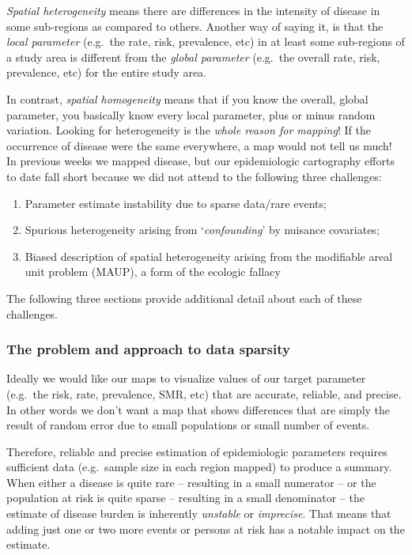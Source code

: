 \documentclass[
]{book}
\providecommand{\tightlist}{%
  \setlength{\itemsep}{0pt}\setlength{\parskip}{0pt}}
\begin{document}
\emph{Spatial heterogeneity} means there are differences in the intensity of disease in some sub-regions as compared to others. Another way of saying it, is that the \emph{local parameter} (e.g.~the rate, risk, prevalence, etc) in at least some sub-regions of a study area is different from the \emph{global parameter} (e.g.~the overall rate, risk, prevalence, etc) for the entire study area.

In contrast, \emph{spatial homogeneity} means that if you know the overall, global parameter, you basically know every local parameter, plus or minus random variation. Looking for heterogeneity is the \emph{whole reason for mapping}! If the occurrence of disease were the same everywhere, a map would not tell us much! In previous weeks we mapped disease, but our epidemiologic cartography efforts to date fall short because we did not attend to the following three challenges:

\begin{enumerate}
\def\labelenumi{\arabic{enumi}.}
\tightlist
\item
  Parameter estimate instability due to sparse data/rare events;
\item
  Spurious heterogeneity arising from `\emph{confounding}' by nuisance covariates;
\item
  Biased description of spatial heterogeneity arising from the modifiable areal unit problem (MAUP), a form of the ecologic fallacy
\end{enumerate}

The following three sections provide additional detail about each of these challenges.

\hypertarget{the-problem-and-approach-to-data-sparsity}{%
\subsubsection{The problem and approach to data sparsity}\label{the-problem-and-approach-to-data-sparsity}}

Ideally we would like our maps to visualize values of our target parameter (e.g.~the risk, rate, prevalence, SMR, etc) that are accurate, reliable, and precise. In other words we don't want a map that shows differences that are simply the result of random error due to small populations or small number of events.

Therefore, reliable and precise estimation of epidemiologic parameters requires sufficient data (e.g.~sample size in each region mapped) to produce a summary. When either a disease is quite rare -- resulting in a small numerator -- or the population at risk is quite sparse -- resulting in a small denominator -- the estimate of disease burden is inherently \emph{unstable} or \emph{imprecise}. That means that adding just one or two more events or persons at risk has a notable impact on the estimate.
\end{document}
